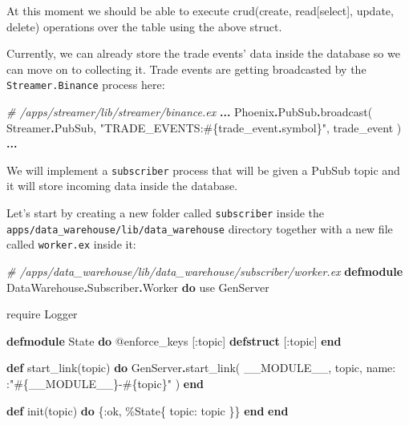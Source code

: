\documentclass[
  oneside]{book}
\newenvironment{Shaded}{\begin{snugshade}}{\end{snugshade}}
\newcommand{\CommentTok}[1]{\textcolor[rgb]{0.56,0.35,0.01}{\textit{#1}}}
\newcommand{\ConstantTok}[1]{\textcolor[rgb]{0.00,0.00,0.00}{#1}}
\newcommand{\ImportTok}[1]{#1}
\newcommand{\KeywordTok}[1]{\textcolor[rgb]{0.13,0.29,0.53}{\textbf{#1}}}
\newcommand{\NormalTok}[1]{#1}
\newcommand{\OperatorTok}[1]{\textcolor[rgb]{0.81,0.36,0.00}{\textbf{#1}}}
\newcommand{\OtherTok}[1]{\textcolor[rgb]{0.56,0.35,0.01}{#1}}
\newcommand{\StringTok}[1]{\textcolor[rgb]{0.31,0.60,0.02}{#1}}
\newcommand{\VariableTok}[1]{\textcolor[rgb]{0.00,0.00,0.00}{#1}}
\begin{document}
At this moment we should be able to execute crud(create, read{[}select{]}, update, delete) operations over the table using the above struct.

Currently, we can already store the trade events' data inside the database so we can move on to collecting it. Trade events are getting broadcasted by the \texttt{Streamer.Binance} process here:

\begin{Shaded}
\begin{Highlighting}[]
    \CommentTok{\# /apps/streamer/lib/streamer/binance.ex}
    \OperatorTok{...}
    \ConstantTok{Phoenix}\OperatorTok{.}\ConstantTok{PubSub}\OperatorTok{.}\NormalTok{broadcast(}
      \ConstantTok{Streamer}\OperatorTok{.}\ConstantTok{PubSub}\NormalTok{,}
      \StringTok{"TRADE\_EVENTS:}\OtherTok{\#\{}\NormalTok{trade\_event}\OperatorTok{.}\NormalTok{symbol}\OtherTok{\}}\StringTok{"}\NormalTok{,}
\NormalTok{      trade\_event}
\NormalTok{    )}
    \OperatorTok{...}
\end{Highlighting}
\end{Shaded}

We will implement a \texttt{subscriber} process that will be given a PubSub topic and it will store incoming data inside the database.

Let's start by creating a new folder called \texttt{subscriber} inside the \texttt{apps/data\_warehouse/lib/data\_warehouse} directory together with a new file called \texttt{worker.ex} inside it:

\begin{Shaded}
\begin{Highlighting}[]
\CommentTok{\# /apps/data\_warehouse/lib/data\_warehouse/subscriber/worker.ex}
\KeywordTok{defmodule} \ConstantTok{DataWarehouse}\OperatorTok{.}\ConstantTok{Subscriber}\OperatorTok{.}\ConstantTok{Worker} \KeywordTok{do}
  \ImportTok{use} \ConstantTok{GenServer}

  \ImportTok{require} \ConstantTok{Logger}

  \KeywordTok{defmodule} \ConstantTok{State} \KeywordTok{do}
    \OtherTok{@enforce\_keys}\NormalTok{ [}\VariableTok{:topic}\NormalTok{]}
    \KeywordTok{defstruct}\NormalTok{ [}\VariableTok{:topic}\NormalTok{]}
  \KeywordTok{end}

  \KeywordTok{def}\NormalTok{ start\_link(topic) }\KeywordTok{do}
    \ConstantTok{GenServer}\OperatorTok{.}\NormalTok{start\_link(}
      \ConstantTok{\_\_MODULE\_\_}\NormalTok{,}
\NormalTok{      topic,}
      \VariableTok{name:}\NormalTok{ :}\StringTok{"}\OtherTok{\#\{}\ConstantTok{\_\_MODULE\_\_}\OtherTok{\}}\StringTok{{-}}\OtherTok{\#\{}\NormalTok{topic}\OtherTok{\}}\StringTok{"}
\NormalTok{    )}
  \KeywordTok{end}

  \KeywordTok{def}\NormalTok{ init(topic) }\KeywordTok{do}
\NormalTok{    \{}\VariableTok{:ok}\NormalTok{,}
\NormalTok{     \%}\ConstantTok{State}\NormalTok{\{}
       \VariableTok{topic:}\NormalTok{ topic}
\NormalTok{     \}\}}
  \KeywordTok{end}
\KeywordTok{end}
\end{Highlighting}
\end{Shaded}
\end{document}
